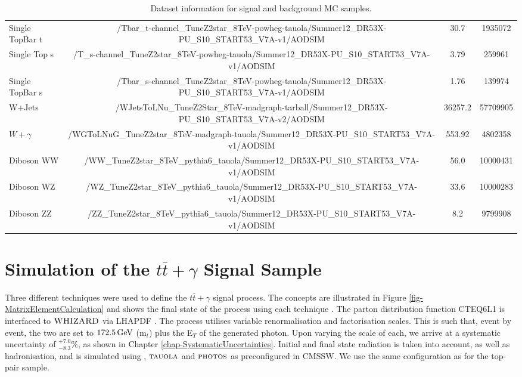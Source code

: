 \begin{table}
\begin{center}
{\begin{tabular}{|l|c|c|c|}
	Single TopBar t & /Tbar\_t-channel\_TuneZ2star\_8TeV-powheg-tauola/Summer12\_DR53X-PU\_S10\_START53\_V7A-v1/AODSIM & 30.7 & 1935072 \\
	Single Top s & /T\_s-channel\_TuneZ2star\_8TeV-powheg-tauola/Summer12\_DR53X-PU\_S10\_START53\_V7A-v1/AODSIM & 3.79 & 259961 \\
	Single TopBar s & /Tbar\_s-channel\_TuneZ2star\_8TeV-powheg-tauola/Summer12\_DR53X-PU\_S10\_START53\_V7A-v1/AODSIM  & 1.76 & 139974 \\
\hline	
	W+Jets & /WJetsToLNu\_TuneZ2Star\_8TeV-madgraph-tarball/Summer12\_DR53X-PU\_S10\_START53\_V7A-v2/AODSIM & 36257.2 & 57709905 \\
\hline	
	$W+\gamma$ & /WGToLNuG\_TuneZ2star\_8TeV-madgraph-tauola/Summer12\_DR53X-PU\_S10\_START53\_V7A-v1/AODSIM & 553.92 & 4802358 \\
\hline	
	Diboson WW & /WW\_TuneZ2star\_8TeV\_pythia6\_tauola/Summer12\_DR53X-PU\_S10\_START53\_V7A-v1/AODSIM & 56.0 & 10000431\\
	Diboson WZ & /WZ\_TuneZ2star\_8TeV\_pythia6\_tauola/Summer12\_DR53X-PU\_S10\_START53\_V7A-v1/AODSIM & 33.6 & 10000283\\
	Diboson ZZ & /ZZ\_TuneZ2star\_8TeV\_pythia6\_tauola/Summer12\_DR53X-PU\_S10\_START53\_V7A-v1/AODSIM & 8.2 & 9799908\\
\hline	
\end{tabular}
}
\end{center}
\caption{Dataset information for signal and background MC samples.}
\label{tab-MCSamples}
\end{table}


\section{Simulation of the $t\bar{t}+\gamma$ Signal Sample} \label{sec-mcsim}

Three different techniques were used to define the $t\bar{t}+\gamma$ signal process. The concepts are illustrated in Figure \ref{fig-MatrixElementCalculation} and shows the final state of the process using each technique \cite{heinerthesis}. The parton distribution function CTEQ6L1 \cite{Pumplin:2002vw} is interfaced to ${\textsc{WHIZARD}}$ via LHAPDF \cite{Whalley:2005nh}. The process utilises variable renormalisation and factorisation scales. This is such that, event by event, the two are set to $172.5 \,\text{Ge\hspace{-.08em}V}$ (m$_t$) plus the E$_T$ of the generated photon. Upon varying the scale of each, we arrive at a systematic uncertainty of $^{+7.0}_{-8.3}\%$, as shown in Chapter \ref{chap-SystematicUncertainties}. Initial and final state radiation is taken into account, as well as hadronisation, and is simulated using  \cite{Sjostrand:2006za}, $\textsc{tauola}$ and $\textsc{photos}$ \cite{Was:2006my} as preconfigured in CMSSW. We use the same configuration as for the top-pair sample.

